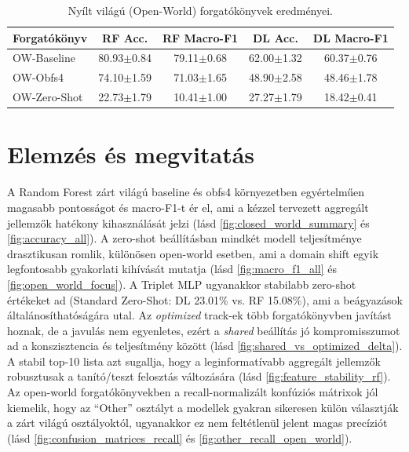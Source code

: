 \documentclass[a4paper,12pt]{article}
\begin{document}
\begin{table}[hbt!]
    \caption{Nyílt világú (Open-World) forgatókönyvek eredményei.}
    \vspace{2mm}
    \centering
    \begin{tabular}{lcccc}
        \toprule
        \textbf{Forgatókönyv} & \textbf{RF Acc.} & \textbf{RF Macro-F1} & \textbf{DL Acc.} & \textbf{DL Macro-F1} \\ \midrule
        OW-Baseline & 80.93$\pm$0.84 & 79.11$\pm$0.68 & 62.00$\pm$1.32 & 60.37$\pm$0.76 \\
        OW-Obfs4 & 74.10$\pm$1.59 & 71.03$\pm$1.65 & 48.90$\pm$2.58 & 48.46$\pm$1.78 \\
        OW-Zero-Shot & 22.73$\pm$1.79 & 10.41$\pm$1.00 & 27.27$\pm$1.79 & 18.42$\pm$0.41 \\
        \bottomrule
    \end{tabular}
\end{table}

\section{Elemzés és megvitatás}
A Random Forest zárt világú baseline és obfs4 környezetben egyértelműen magasabb
pontosságot és macro-F1-t ér el, ami a kézzel tervezett aggregált jellemzők hatékony
kihasználását jelzi (lásd \ref{fig:closed_world_summary} és \ref{fig:accuracy_all}).
A zero-shot beállításban mindkét modell teljesítménye drasztikusan romlik, különösen
open-world esetben, ami a domain shift egyik legfontosabb gyakorlati kihívását mutatja
(lásd \ref{fig:macro_f1_all} és \ref{fig:open_world_focus}). A Triplet MLP ugyanakkor
stabilabb zero-shot értékeket ad (Standard Zero-Shot: DL 23.01\% vs. RF 15.08\%), ami a
beágyazások általánosíthatóságára utal.
Az \textit{optimized} track-ek több forgatókönyvben javítást hoznak, de a javulás nem
egyenletes, ezért a \textit{shared} beállítás jó kompromisszumot ad a konszisztencia és
teljesítmény között (lásd \ref{fig:shared_vs_optimized_delta}). A stabil top-10 lista
azt sugallja, hogy a leginformatívabb aggregált jellemzők robusztusak a tanító/teszt
felosztás változására (lásd \ref{fig:feature_stability_rf}).
Az open-world forgatókönyvekben a recall-normalizált konfúziós mátrixok jól kiemelik,
hogy az ``Other'' osztályt a modellek gyakran sikeresen külön választják a zárt világú
osztályoktól, ugyanakkor ez nem feltétlenül jelent magas precíziót
(lásd \ref{fig:confusion_matrices_recall} és \ref{fig:other_recall_open_world}).
\end{document}
